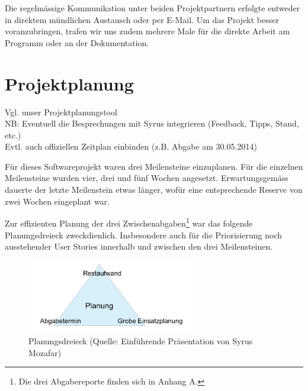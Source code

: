Die regelmässige Kommunikation unter beiden Projektpartnern erfolgte entweder in direktem mündlichen Austausch oder per E-Mail. Um das Projekt besser voranzubringen, trafen wir uns zudem mehrere Male für die direkte Arbeit am Programm oder an der Dokumentation.



\section{Projektplanung}



Vgl. unser Projektplanungstool \\

NB: Eventuell die Besprechungen mit Syrus integrieren (Feedback, Tipps, Stand, etc.) \\

Evtl. auch offiziellen Zeitplan einbinden (z.B. Abgabe am 30.05.2014) \\

\vspace*{1cm}



Für dieses Softwareprojekt waren drei Meilensteine einzuplanen. Für die einzelnen Meilensteine wurden vier, drei und fünf Wochen angesetzt. Erwartungsgemäss dauerte der letzte Meilenstein etwas länger, wofür eine entsprechende Reserve von zwei Wochen eingeplant war.

Zur effizienten Planung der drei Zwischenabgaben\footnote{Die drei Abgabereporte finden sich in Anhang A.} war das folgende Planungsdreieck zweckdienlich. Insbesondere auch für die Priorisierung noch ausstehender User Stories innerhalb und zwischen den drei Meilensteinen. \\


\begin{figure}[h]
  \centering
	\includegraphics [width=0.65\textwidth]{images/Planungsdreieck_Quelle.png} 
	\caption{Planungsdreieck (Quelle: Einführende Präsentation von Syrus Mozafar)}
\end{figure}




